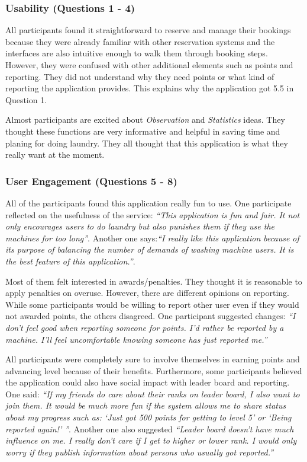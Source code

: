 \subsubsection{Usability (Questions 1 - 4)}
All participants found it straightforward to reserve and manage their bookings because they were already familiar with other reservation systems and the interfaces are also intuitive enough to walk them through booking steps. However, they were confused with other additional elements such as points and reporting. They did not understand why they need points or what kind of reporting the application provides. This explains why the application got 5.5 in Question 1.

Almost participants are excited about \emph{Observation} and \emph{Statistics} ideas. They thought these functions are very informative and helpful in saving time and planing for doing laundry. They all thought that this application is what they really want at the moment. 
\subsubsection{User Engagement (Questions 5 - 8)}
All of the participants found this application really fun to use. One participate reflected on the usefulness of the service: \textit{``This application is fun and fair. It not only encourages users to do laundry but also punishes them if they use the machines for too long''}. Another one says:\textit{``I really like this application because of its purpose of balancing the number of demands of washing machine users. It is the best feature of this application.''}.

Most of them felt interested in awards/penalties. They thought it is reasonable to apply penalties on overuse. However, there are different opinions on reporting. While some participants would be willing to report other user even if they would not awarded points, the others disagreed. One participant suggested changes: \textit{``I don't feel good when reporting someone for points. I'd rather be reported by a machine. I'll feel uncomfortable knowing someone has just reported me.''} 

All participants were completely sure to involve themselves in earning points and advancing level because of their benefits. Furthermore, some participants believed the application could also have social impact with leader board and reporting. One said: \textit{``If my friends do care about their ranks on leader board, I also want to join them. It would be much more fun if the system allows me to share status about my progress such as: `Just got 500 points for getting to level 5' or `Being reported again!' ''}. Another one also suggested \textit{``Leader board doesn't have much influence on me. I really don't care if I get to higher or lower rank. I would only worry if they publish information about persons who usually got reported.''}
